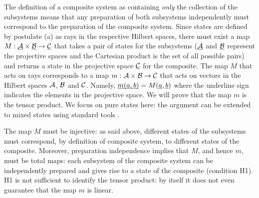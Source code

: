 \documentclass[aps,prl,amsmath,amssymb,twocolumn,nofootinbib]{revtex4}
\theoremstyle{plain}
\theoremstyle{definition}
\theoremstyle{remark}
\newcommand{\pj}[1] {\underbar{$#1$}}
\begin{document}
	The definition of a composite system as containing {\em only} the
	collection of the subsystems means that any preparation of both
	subsystems independently must correspond to the preparation of the
	composite system. Since states are defined by postulate (a) as rays in
	the respective Hilbert spaces, there must exist a map $M : \pj{\cal A}
	\times \pj{\cal B } \to \pj{\cal C}$ that takes a pair of states for
	the subsystems ($\pj{\cal A}$ and $\pj{\cal B }$ represent the
	projective spaces and the Cartesian product is the set of all possible
	pairs) and returns a state in the projective space $\pj{\cal C}$ for
	the composite. The map $M$ that acts on rays corresponds to a map
	$m:{\cal A}\times{\cal B}\to{\cal C}$ that acts on vectors in the
	Hilbert spaces $\cal A$, $\cal B$ and $\cal C$.  Namely,
	$\pj{m(a,b)}=M(\pj{a},\pj{b})$ where the underline sign indicates the
	elements in the projective space. We will prove that the map $m$ is
	the tensor product. We focus on pure states here: the argument can be
	extended to mixed states using standard tools \cite{nielsenchuang}.
	
	The map $M$ must be injective: as said above, different states of the
	subsystems must correspond, by definition of composite system, to
	different states of the composite. Moreover, preparation independence
	implies that $M$, and hence $m$, must be total maps: each subsystem of
	the composite system can be independently prepared and gives rise to a
	state of the composite (condition H1).  H1 is not sufficient
	to identify the tensor product: by itself it does not even guarantee
	that the map $m$ is linear.
	
\end{document}
